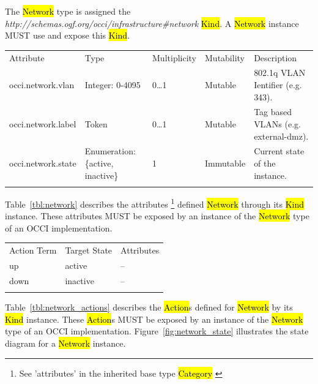 \documentclass[10pt,a4paper]{article}
\begin{document}
The \hl{Network} type is assigned the \textit{http://schemas.ogf.org/occi/infrastructure\#network} \hl{Kind}. A \hl{Network} instance MUST use and expose this \hl{Kind}.

{
	\begin{tabular}{lp{2.5cm}p{1cm}lp{6cm}}
	\toprule
	Attribute&Type&Multi\-plicity&Mutability&Description\\
	\colrule
	occi.network.vlan & Integer: 0-4095 & 0\ldots1 & Mutable 
	& 802.1q VLAN Ientifier (e.g. 343).\\
	occi.network.label & Token & 0\ldots1 & Mutable 
	& Tag based VLANs (e.g. external-dmz).\\
	occi.network.state & Enumeration: \{active, inactive\} & 1 & Immutable 
	& Current state of the instance.\\
	\botrule
	\end{tabular}
}
Table~\ref{tbl:network} describes the attributes \footnote{See ’attributes’ in the inherited 
base type \hl{Category}  \cite{occi:core}} 
defined \hl{Network} through its \hl{Kind} instance. These attributes
MUST be exposed by an instance of the \hl{Network} type of an OCCI implementation.

{
	\begin{tabular}{lll}
	\toprule
	Action Term&Target State&Attributes\\
	\colrule
	up & active & --\\
	down & inactive & --\\
	\botrule
	\end{tabular}
}

Table~\ref{tbl:network_actions} describes the \hl{Action}s defined for
\hl{Network} by its \hl{Kind} instance. These \hl{Action}s MUST be exposed 
by an instance of the \hl{Network} type of an OCCI implementation. 
Figure~\ref{fig:network_state} illustrates the state diagram for a \hl{Network} instance.
\end{document}
